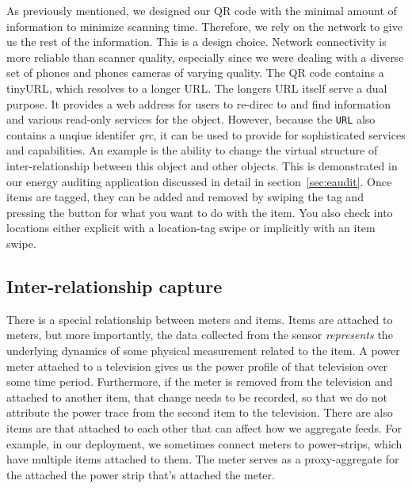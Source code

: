 As previously mentioned, we designed our QR code with the minimal amount of information to minimize scanning time.  Therefore, we rely
on the network to give us the rest of the information.  This is a design choice.  Network connectivity is more reliable
than scanner quality, especially since we were dealing with a diverse set of phones and phones cameras of varying quality.
The QR code contains a tinyURL, which resolves to a longer URL.  The longers URL itself serve a dual purpose.  It provides 
a web address for users to re-direc to and find information and various read-only services for the object.  However, because
the {\tt URL} also contains a unqiue identifer \emph{qrc}, it can be used to provide for sophisticated services and capabilities.
An example is the ability to change the virtual structure of inter-relationship between this object and other objects.  This
is demonstrated in our energy auditing application discussed in detail in section~\ref{sec:eaudit}.
Once items are tagged, they can be added and removed by swiping the tag and pressing the button for what you want to do with
the item.  You also check into locations either explicit with a location-tag swipe or implicitly with an item swipe.

\subsection{Inter-relationship capture}
\label{sec:binding}
There is a special relationship between meters and items.  Items are attached to meters, but more importantly, the data
collected from the sensor \emph{represents} the underlying dynamics of some physical measurement related to the item.  A power 
meter attached to a television gives us the power profile of that television over some time period.  Furthermore, if the meter 
is removed
from the television and attached to another item, that change needs to be recorded, so that we do not attribute the power
trace from the second item to the television.  There are also items are that attached to each other that can affect how we 
aggregate feeds.  For example, in our deployment, we sometimes connect meters to power-strips, which have multiple items
attached to them.  The meter serves as a proxy-aggregate for the attached the power strip that's attached the meter.

